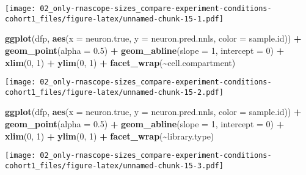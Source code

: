 \documentclass[
]{article}
\newenvironment{Shaded}{\begin{snugshade}}{\end{snugshade}}
\newcommand{\AttributeTok}[1]{\textcolor[rgb]{0.13,0.29,0.53}{#1}}
\newcommand{\DecValTok}[1]{\textcolor[rgb]{0.00,0.00,0.81}{#1}}
\newcommand{\FloatTok}[1]{\textcolor[rgb]{0.00,0.00,0.81}{#1}}
\newcommand{\FunctionTok}[1]{\textcolor[rgb]{0.13,0.29,0.53}{\textbf{#1}}}
\newcommand{\NormalTok}[1]{#1}
\newcommand{\SpecialCharTok}[1]{\textcolor[rgb]{0.81,0.36,0.00}{\textbf{#1}}}
\begin{document}
\texttt{[image: 02\_only-rnascope-sizes\_compare-experiment-conditions-cohort1\_files/figure-latex/unnamed-chunk-15-1.pdf]}

\begin{Shaded}
\begin{Highlighting}[]
\FunctionTok{ggplot}\NormalTok{(dfp, }\FunctionTok{aes}\NormalTok{(}\AttributeTok{x =}\NormalTok{ neuron.true, }\AttributeTok{y =}\NormalTok{ neuron.pred.nnls, }\AttributeTok{color =}\NormalTok{ sample.id)) }\SpecialCharTok{+} 
  \FunctionTok{geom\_point}\NormalTok{(}\AttributeTok{alpha =} \FloatTok{0.5}\NormalTok{) }\SpecialCharTok{+} \FunctionTok{geom\_abline}\NormalTok{(}\AttributeTok{slope =} \DecValTok{1}\NormalTok{, }\AttributeTok{intercept =} \DecValTok{0}\NormalTok{) }\SpecialCharTok{+}
  \FunctionTok{xlim}\NormalTok{(}\DecValTok{0}\NormalTok{, }\DecValTok{1}\NormalTok{) }\SpecialCharTok{+} \FunctionTok{ylim}\NormalTok{(}\DecValTok{0}\NormalTok{, }\DecValTok{1}\NormalTok{) }\SpecialCharTok{+} \FunctionTok{facet\_wrap}\NormalTok{(}\SpecialCharTok{\textasciitilde{}}\NormalTok{cell.compartment)}
\end{Highlighting}
\end{Shaded}

\texttt{[image: 02\_only-rnascope-sizes\_compare-experiment-conditions-cohort1\_files/figure-latex/unnamed-chunk-15-2.pdf]}

\begin{Shaded}
\begin{Highlighting}[]
\FunctionTok{ggplot}\NormalTok{(dfp, }\FunctionTok{aes}\NormalTok{(}\AttributeTok{x =}\NormalTok{ neuron.true, }\AttributeTok{y =}\NormalTok{ neuron.pred.nnls, }\AttributeTok{color =}\NormalTok{ sample.id)) }\SpecialCharTok{+} 
  \FunctionTok{geom\_point}\NormalTok{(}\AttributeTok{alpha =} \FloatTok{0.5}\NormalTok{) }\SpecialCharTok{+} \FunctionTok{geom\_abline}\NormalTok{(}\AttributeTok{slope =} \DecValTok{1}\NormalTok{, }\AttributeTok{intercept =} \DecValTok{0}\NormalTok{) }\SpecialCharTok{+}
  \FunctionTok{xlim}\NormalTok{(}\DecValTok{0}\NormalTok{, }\DecValTok{1}\NormalTok{) }\SpecialCharTok{+} \FunctionTok{ylim}\NormalTok{(}\DecValTok{0}\NormalTok{, }\DecValTok{1}\NormalTok{) }\SpecialCharTok{+} \FunctionTok{facet\_wrap}\NormalTok{(}\SpecialCharTok{\textasciitilde{}}\NormalTok{library.type)}
\end{Highlighting}
\end{Shaded}

\texttt{[image: 02\_only-rnascope-sizes\_compare-experiment-conditions-cohort1\_files/figure-latex/unnamed-chunk-15-3.pdf]}
\end{document}
